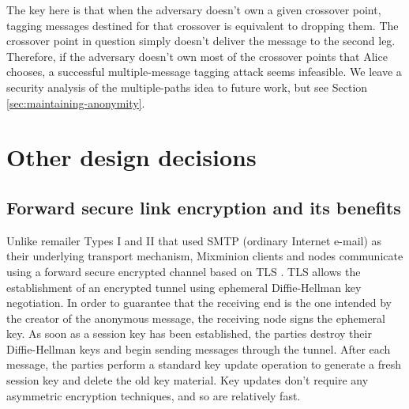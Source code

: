 \documentclass[final,inpress,inline]{ieee}
\begin{document}

The key here is that when the adversary doesn't own a given crossover
point, tagging messages destined for that crossover is equivalent to
dropping them.  The crossover point in question simply doesn't deliver
the message to the second leg. Therefore, if the adversary doesn't own
most of the crossover points that Alice chooses, a successful
multiple-message tagging attack seems infeasible.  We leave a security
analysis of the multiple-paths idea to future work, but see
Section \ref{sec:maintaining-anonymity}.

\section{Other design decisions}


\subsection{Forward secure link encryption and its benefits}
\label{subsec:link-encrypt}

Unlike remailer Types I and II that used SMTP \cite{SMTP} (ordinary
Internet e-mail) as their underlying transport mechanism, Mixminion
clients and nodes communicate using a forward secure encrypted channel
based on TLS \cite{TLS}.  
TLS allows the establishment of an encrypted tunnel using ephemeral
Diffie-Hellman key negotiation. In order to guarantee that the receiving end is
the one intended by the creator of the anonymous message, the
receiving node signs the ephemeral key. As soon as a session key
has been established, the parties destroy their Diffie-Hellman keys
and begin sending messages through the tunnel. After each message, the
parties perform a standard key update operation to generate a fresh
session key and delete the old key material.  Key updates don't require any
asymmetric encryption techniques, and so are relatively fast.
\end{document}
